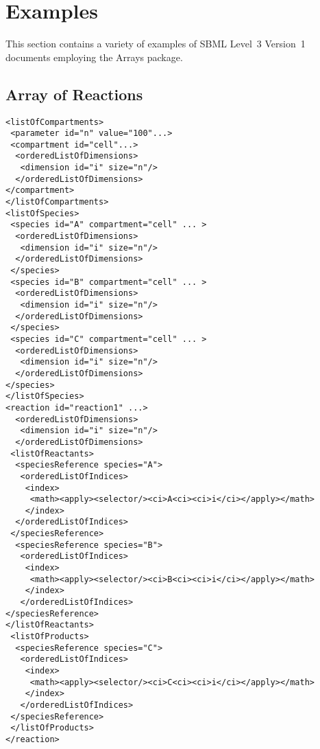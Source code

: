 
\section{Examples}
\label{examples}

This section contains a variety of examples of SBML Level~3 Version~1
documents employing the Arrays package.

\subsection{Array of Reactions}

\begin{verbatim}
<listOfCompartments> 
 <parameter id="n" value="100"...>
 <compartment id="cell"...>
  <orderedListOfDimensions>
   <dimension id="i" size="n"/>
  </orderedListOfDimensions>
</compartment>
</listOfCompartments> 
<listOfSpecies>
 <species id="A" compartment="cell" ... > 
  <orderedListOfDimensions>
   <dimension id="i" size="n"/>
  </orderedListOfDimensions>
 </species>
 <species id="B" compartment="cell" ... > 
  <orderedListOfDimensions>
   <dimension id="i" size="n"/>
  </orderedListOfDimensions>
 </species>
 <species id="C" compartment="cell" ... >
  <orderedListOfDimensions>
   <dimension id="i" size="n"/>
  </orderedListOfDimensions>
</species>
</listOfSpecies>
<reaction id="reaction1" ...> 
  <orderedListOfDimensions>
   <dimension id="i" size="n"/>
  </orderedListOfDimensions>
 <listOfReactants>
  <speciesReference species="A">
   <orderedListOfIndices>
    <index>
     <math><apply><selector/><ci>A<ci><ci>i</ci></apply></math>
    </index>
  </orderedListOfIndices>
 </speciesReference>
  <speciesReference species="B"> 
   <orderedListOfIndices>
    <index>
     <math><apply><selector/><ci>B<ci><ci>i</ci></apply></math>
    </index>
   </orderedListOfIndices>
</speciesReference>
</listOfReactants> 
 <listOfProducts>
  <speciesReference species="C"> 
   <orderedListOfIndices>
    <index>
     <math><apply><selector/><ci>C<ci><ci>i</ci></apply></math>
    </index>
   </orderedListOfIndices>
 </speciesReference>
 </listOfProducts>
</reaction>
\end{verbatim}



